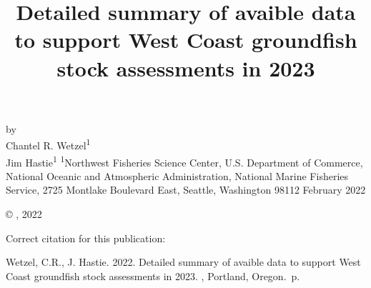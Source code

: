 \documentclass[11pt,
  english,
  letterpaper,
]{article}
\date{}
\newcommand{\trTitle}{Detailed summary of avaible data to support West Coast groundfish stock assessments in 2023}
\newcommand{\trYear}{2022}
\newcommand{\trMonth}{February}
\newcommand{\trAuthsBack}{Wetzel, C.R., J. Hastie}
\newcommand{\trCitation}{
\begin{hangparas}{1em}{1}
\trAuthsBack{}. \trYear{}. \trTitle{}. \glsentrylong{pfmc}, Portland, Oregon. \pageref{LastPage}{}\,p.
\end{hangparas}}
\begin{document}

\renewcommand*{\thefootnote}{\fnsymbol{footnote}}

\small
\thispagestyle{empty}
\noindent
\begin{center}
\title{Detailed summary of avaible data to support West Coast groundfish stock assessments in 2023}
\vspace{1.5cm}
{\Large\textbf{}}
\vfill
by\\
Chantel R. Wetzel\textsuperscript{1}\\
Jim Hastie\textsuperscript{1}\vfill
\textsuperscript{1}Northwest Fisheries Science Center, U.S. Department of Commerce, National Oceanic and Atmospheric Administration, National Marine Fisheries Service, 2725 Montlake Boulevard East, Seattle, Washington 98112\vfill
\trMonth{} \trYear{}
\end{center}
\clearpage

\thispagestyle{empty}
\vspace*{\fill}
\begin{center}
\copyright{} , \trYear{}\\
\end{center}
\par
\bigskip
\noindent
Correct citation for this publication:
\bigskip
\par
\trCitation{}
\clearpage


\tableofcontents\clearpage
\label{TRlastRoman}
\clearpage

\newpage
\thispagestyle{empty} %

\pagestyle{plain}  %
\renewcommand*{\thefootnote}{\arabic{footnote}}  %
\setcounter{footnote}{0}  %
\renewcommand{\headrulewidth}{0.5pt}
\renewcommand{\footrulewidth}{0.5pt}

\newcommand{\lt}{\ensuremath <}
\newcommand{\gt}{\ensuremath >}
\end{document}
